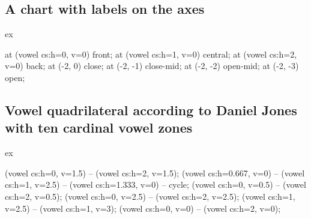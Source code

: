 \documentclass[a4paper,11pt]{article}
\begin{document}
\subsection*{A chart with labels on the axes}

\begin{tcblisting}{ex}
\begin{vowelchart}[width=3cm, simple]
  \begin{scope}[font=\footnotesize]
    \node[anchor=south, yshift=4mm] at (vowel cs:h=0, v=0) {front};
    \node[anchor=south, yshift=4mm] at (vowel cs:h=1, v=0) {central};
    \node[anchor=south, yshift=4mm] at (vowel cs:h=2, v=0) {back};
    \node[anchor=west] at (-2, 0) {close};
    \node[anchor=west] at (-2, -1) {close-mid};
    \node[anchor=west] at (-2, -2) {open-mid};
    \node[anchor=west] at (-2, -3) {open};
  \end{scope}
    
    
    
   
\end{vowelchart}
\end{tcblisting}

\subsection*{Vowel quadrilateral according to Daniel Jones with ten cardinal vowel zones}
\label{sec:ExJones}

\begin{tcblisting}{ex}
\begin{vowelchart}[slanted, plain, linewidth=1.5pt, dotsize=2.5pt, width=5cm]
  \draw[line width=0.5pt] (vowel cs:h=0, v=1.5) -- (vowel cs:h=2, v=1.5);
  \draw[line width=0.5pt, fill=vowelchartbg] (vowel cs:h=0.667, v=0) -- (vowel cs:h=1, v=2.5) -- (vowel cs:h=1.333, v=0) -- cycle;
  \draw[line width=0.5pt] (vowel cs:h=0, v=0.5) -- (vowel cs:h=2, v=0.5);
  \draw[line width=0.5pt] (vowel cs:h=0, v=2.5) -- (vowel cs:h=2, v=2.5);
  \draw[line width=0.5pt] (vowel cs:h=1, v=2.5) -- (vowel cs:h=1, v=3);
   
   
   
   
   
          
  \draw[line width=\vowelchartline] (vowel cs:h=0, v=0) -- (vowel cs:h=2, v=0);
\end{vowelchart}
\end{tcblisting}
\end{document}
